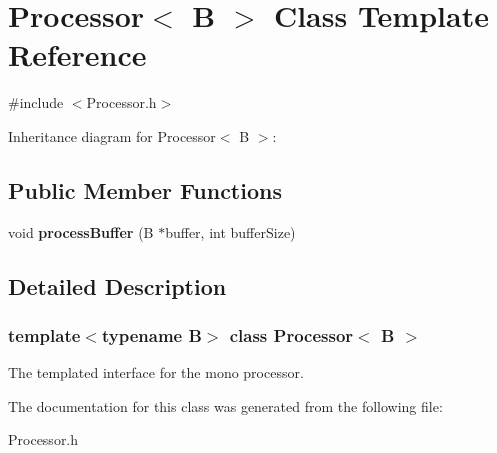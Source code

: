 \hypertarget{classProcessor}{}\section{Processor$<$ B $>$ Class Template Reference}
\label{classProcessor}


{\ttfamily \#include $<$Processor.\+h$>$}



Inheritance diagram for Processor$<$ B $>$\+:
\subsection*{Public Member Functions}
\begin{DoxyCompactItemize}
\item 
\mbox{\label{classProcessor_acd4627a2a2d76e607ce0dd60cc646bae}} 
void {\bfseries process\+Buffer} (B $\ast$buffer, int buffer\+Size)
\end{DoxyCompactItemize}


\subsection{Detailed Description}
\subsubsection*{template$<$typename B$>$\newline
class Processor$<$ B $>$}

The templated interface for the mono processor. 

The documentation for this class was generated from the following file\+:\begin{DoxyCompactItemize}
\item 
Processor.\+h\end{DoxyCompactItemize}
